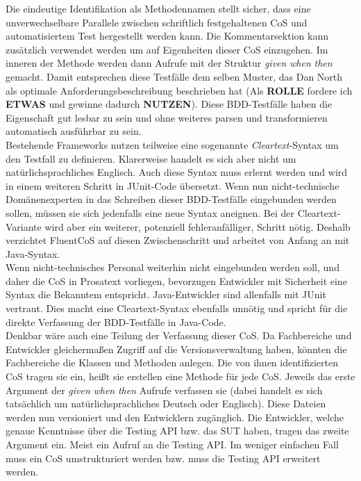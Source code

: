Die eindeutige Identifikation als Methodennamen stellt sicher, dass eine unverwechselbare Parallele zwischen schriftlich festgehaltenen CoS und automatisiertem Test hergestellt werden kann. Die Kommentarsektion kann zusätzlich verwendet werden um auf Eigenheiten dieser CoS einzugehen. Im inneren der Methode werden dann Aufrufe mit der Struktur \textit{given} \textit{when} \textit{then} gemacht. Damit entsprechen diese Testfälle dem selben Muster, das Dan North als optimale Anforderungsbeschreibung beschrieben hat (Als \textbf{ROLLE} fordere ich \textbf{ETWAS} und gewinne dadurch \textbf{NUTZEN}). Diese BDD-Testfälle haben die Eigenschaft gut lesbar zu sein und ohne weiteres parsen und transformieren automatisch ausführbar zu sein.\\
Bestehende Frameworks nutzen teilweise eine sogenannte \textit{Cleartext}-Syntax um den Testfall zu definieren. Klarerweise handelt es sich aber nicht um natürlichsprachliches Englisch. Auch diese Syntax muss erlernt werden und wird in einem weiteren Schritt in JUnit-Code übersetzt. Wenn nun nicht-technische Domänenexperten in das Schreiben dieser BDD-Testfälle eingebunden werden sollen, müssen sie sich jedenfalls eine neue Syntax aneignen. Bei der Cleartext-Variante wird aber ein weiterer, potenziell fehleranfälliger, Schritt nötig. Deshalb verzichtet FluentCoS auf diesen Zwischenschritt und arbeitet von Anfang an mit Java-Syntax.\\
Wenn nicht-technisches Personal weiterhin nicht eingebunden werden soll, und daher die CoS in Prosatext vorliegen, bevorzugen Entwickler mit Sicherheit eine Syntax die Bekanntem entspricht. Java-Entwickler sind allenfalls mit JUnit vertraut. Dies macht eine Cleartext-Syntax ebenfalls unnötig und spricht für die direkte Verfassung der BDD-Testfälle in Java-Code.\\
Denkbar wäre auch eine Teilung der Verfassung dieser CoS. Da Fachbereiche und Entwickler gleichermaßen Zugriff auf die Versionsverwaltung haben, könnten die Fachbereiche die Klassen und Methoden anlegen. Die von ihnen identifizierten CoS tragen sie ein, heißt sie erstellen eine Methode für jede CoS. Jeweils das erste Argument der \textit{given} \textit{when} \textit{then} Aufrufe verfassen sie (dabei handelt es sich tatsächlich um natürlichsprachliches Deutsch oder Englisch). Diese Dateien werden nun versioniert und den Entwicklern zugänglich. Die Entwickler, welche genaue Kenntnisse über die Testing API bzw. das \Gls{SUT} haben, tragen das zweite Argument ein. Meist ein Aufruf an die Testing API. Im weniger einfachen Fall muss ein CoS umstrukturiert werden bzw. muss die Testing API erweitert werden.\\
